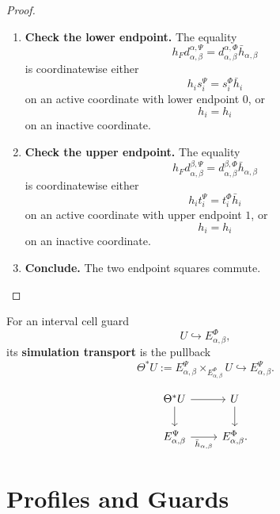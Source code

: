 \begin{proof}
    \leavevmode
    \begin{enumerate}
        \item \textbf{Check the lower endpoint.}
        The equality
        \[
            h_Fd_{\alpha,\beta}^{\alpha,\Psi}
            =
            d_{\alpha,\beta}^{\alpha,\Phi}\bar h_{\alpha,\beta}
        \]
        is coordinatewise either
        \[
            h_is_i^\Psi=s_i^\Phi\bar h_i
        \]
        on an active coordinate with lower endpoint \(0\), or
        \[
            h_i=h_i
        \]
        on an inactive coordinate.

        \item \textbf{Check the upper endpoint.}
        The equality
        \[
            h_Fd_{\alpha,\beta}^{\beta,\Psi}
            =
            d_{\alpha,\beta}^{\beta,\Phi}\bar h_{\alpha,\beta}
        \]
        is coordinatewise either
        \[
            h_it_i^\Psi=t_i^\Phi\bar h_i
        \]
        on an active coordinate with upper endpoint \(1\), or
        \[
            h_i=h_i
        \]
        on an inactive coordinate.

        \item \textbf{Conclude.}
        The two endpoint squares commute.
    \end{enumerate}
\end{proof}

\begin{definition}
\label{def:cmett-transport-interval-guards}
    For an interval cell guard
    \[
        U\hookrightarrow E_{\alpha,\beta}^{\Phi},
    \]
    its \textbf{simulation transport} is the pullback
    \[
        \Theta^*U
        :=
        E_{\alpha,\beta}^{\Psi}
        \times_{E_{\alpha,\beta}^{\Phi}}
        U
        \hookrightarrow E_{\alpha,\beta}^{\Psi}.
    \]
\end{definition}

\[
\begin{tikzcd}
\Theta^*U
    \arrow[r]
    \arrow[d]
&
U
    \arrow[d]
\\
E_{\alpha,\beta}^{\Psi}
    \arrow[r,"\bar h_{\alpha,\beta}"']
&
E_{\alpha,\beta}^{\Phi}.
\end{tikzcd}
\]

\section{Profiles and Guards}
\label{sec:cmett-profiles-and-guards}

